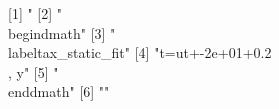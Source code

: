   [1] "%
  [2] "\\begin{dmath}"                                                                                                                                                                                                                                                                                                                                                                                                                                                                              
  [3] "\\label{tax_static_fit}"                                                                                                                                                                                                                                                                                                                                                                                                                                                                     
  [4] "{t}={ut}+-2e+01+0.2\\, {y}"                                                                                                                                                                                                                                                                                                                                                                                                                                                                  
  [5] "\\end{dmath}"                                                                                                                                                                                                                                                                                                                                                                                                                                                                                
  [6] ""                                                                                                                                                                                                                                                                                                                                                                                                                                                                                            
